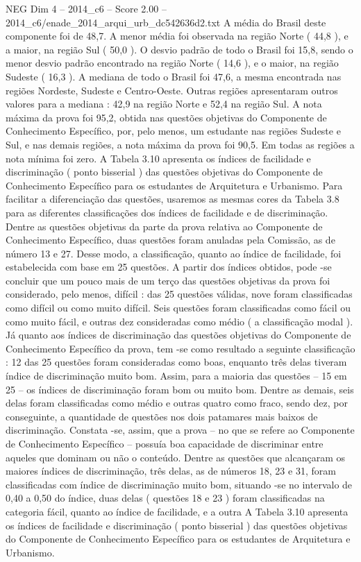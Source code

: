 \begin{textsample}{NEG Dim 4 – 2014\_c6 – Score 2.00 – 2014\_c6/enade\_2014\_arqui\_urb\_dc542636d2.txt}
A média do Brasil deste componente foi de 48,7.
A menor média foi observada na região Norte ( 44,8 ), e a maior, na região Sul ( 50,0 ).
O desvio padrão de todo o Brasil foi 15,8, sendo o menor desvio padrão encontrado na região Norte ( 14,6 ), e o maior, na região Sudeste ( 16,3 ).
A mediana de todo o Brasil foi 47,6, a mesma encontrada nas regiões Nordeste, Sudeste e Centro-Oeste.
Outras regiões apresentaram outros valores para a mediana : 42,9 na região Norte e 52,4 na região Sul.
A nota máxima da prova foi 95,2, obtida nas questões objetivas do Componente de Conhecimento Específico, por, pelo menos, um estudante nas regiões Sudeste e Sul, e nas demais regiões, a nota máxima da prova foi 90,5.
Em todas as regiões a nota mínima foi zero.
A Tabela 3.10 apresenta os índices de facilidade e discriminação ( ponto bisserial ) das questões objetivas do Componente de Conhecimento Específico para os estudantes de Arquitetura e Urbanismo.
Para facilitar a diferenciação das questões, usaremos as mesmas cores da Tabela 3.8 para as diferentes classificações dos índices de facilidade e de discriminação.
Dentre as questões objetivas da parte da prova relativa ao Componente de Conhecimento Específico, duas questões foram anuladas pela Comissão, as de número 13 e 27.
Desse modo, a classificação, quanto ao índice de facilidade, foi estabelecida com base em 25 questões.
A partir dos índices obtidos, pode -se concluir que um pouco mais de um terço das questões objetivas da prova foi considerado, pelo menos, difícil : das 25 questões válidas, nove foram classificadas como difícil ou como muito difícil.
Seis questões foram classificadas como fácil ou como muito fácil, e outras dez consideradas como médio ( a classificação modal ).
Já quanto aos índices de discriminação das questões objetivas do Componente de Conhecimento Específico da prova, tem -se como resultado a seguinte classificação : 12 das 25 questões foram consideradas como boas, enquanto três delas tiveram índice de discriminação muito bom.
Assim, para a maioria das questões – 15 em 25 – os índices de discriminação foram bom ou muito bom.
Dentre as demais, seis delas foram classificadas como médio e outras quatro como fraco, sendo dez, por conseguinte, a quantidade de questões nos dois patamares mais baixos de discriminação.
Constata -se, assim, que a prova – no que se refere ao Componente de Conhecimento Específico – possuía boa capacidade de discriminar entre aqueles que dominam ou não o conteúdo.
Dentre as questões que alcançaram os maiores índices de discriminação, três delas, as de números 18, 23 e 31, foram classificadas com índice de discriminação muito bom, situando -se no intervalo de 0,40 a 0,50 do índice, duas delas ( questões 18 e 23 ) foram classificadas na categoria fácil, quanto ao índice de facilidade, e a outra A Tabela 3.10 apresenta os índices de facilidade e discriminação ( ponto bisserial ) das questões objetivas do Componente de Conhecimento Específico para os estudantes de Arquitetura e Urbanismo.

\end{textsample}

